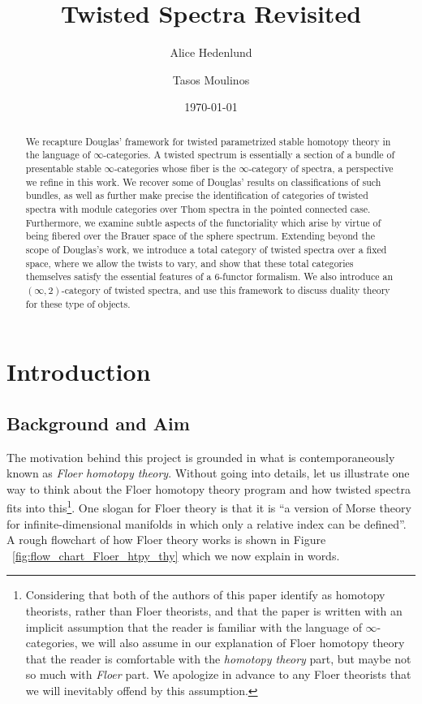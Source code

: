 \documentclass[10pt]{amsart}
\author{Alice Hedenlund}
\author{Tasos Moulinos}
\title{Twisted Spectra Revisited}
\date{\today}
\theoremstyle{plain}
\theoremstyle{definition}
\begin{document}
\begin{abstract}
  We recapture Douglas' framework for twisted parametrized stable homotopy theory in the language of $\infty$-categories.
  A twisted spectrum is essentially a section of a bundle of presentable stable $\infty$-categories whose fiber is the $\infty$-category of spectra, a perspective we refine in this work.
  We recover some of Douglas' results on classifications of such bundles, as well as further make precise the identification of categories of twisted spectra with module categories over Thom spectra in the pointed connected case. Furthermore, we examine subtle aspects of the functoriality which arise by virtue of being fibered over the Brauer space of the sphere spectrum.
  Extending beyond the scope of Douglas's work, we introduce a total category of twisted spectra over a fixed space, where we allow the twists to vary, and show that these total categories themselves satisfy the essential features of a 6-functor formalism.
  We also introduce an $(\infty,2)$-category of twisted spectra, and use this framework to discuss duality theory for these type of objects.
\end{abstract}

\maketitle

\setcounter{tocdepth}{1}
\tableofcontents

\section*{Introduction}

\subsection*{Background and Aim}

The motivation behind this project is grounded in what is contemporaneously known as \emph{Floer homotopy theory}.
Without going into details, let us illustrate one way to think about the Floer homotopy theory program and how twisted spectra fits into this\footnote{Considering that both of the authors of this paper identify as homotopy theorists, rather than Floer theorists, and that the paper is written with an implicit assumption that the reader is familiar with the language of $\infty$-categories, we will also assume in our explanation of Floer homotopy theory that the reader is comfortable with the \emph{homotopy theory} part, but maybe not so much with \emph{Floer} part. We apologize in advance to any Floer theorists that we will inevitably offend by this assumption.}.
One slogan for Floer theory is that it is ``a version of Morse theory for infinite-dimensional manifolds in which only a relative index can be defined''.
A rough flowchart of how Floer theory works is shown in Figure ~\ref{fig:flow_chart_Floer_htpy_thy} which we now explain in words.
\end{document}
